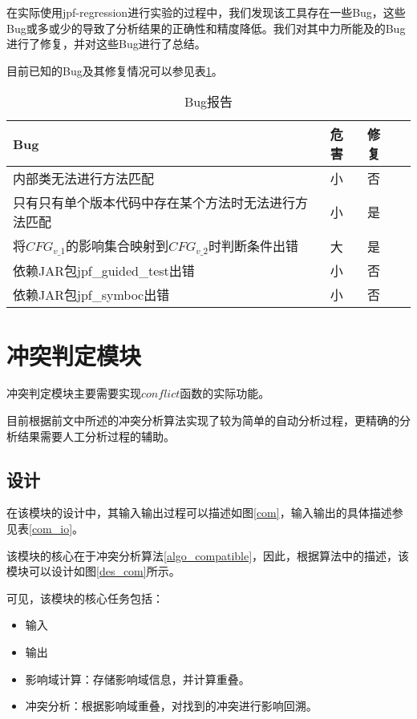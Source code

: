 在实际使用jpf-regression进行实验的过程中，我们发现该工具存在一些Bug，这些Bug或多或少的导致了分析结果的正确性和精度降低。我们对其中力所能及的Bug进行了修复，并对这些Bug进行了总结。

目前已知的Bug及其修复情况可以参见表\ref {bug_data}。

\begin{table}
	\caption{Bug报告}
	\label{bug_data}
	\centering
	\begin{tabular}{lllc}
		\toprule[1.5pt]
		{\heiti Bug} &{\heiti 危害} & {\heiti 修复} \\\midrule[1pt]
		内部类无法进行方法匹配 & 小 & 否\\
		只有只有单个版本代码中存在某个方法时无法进行方法匹配 & 小 & 是\\
		将$CFG_{v\_1}$的影响集合映射到$CFG_{v\_2}$时判断条件出错 & 大 & 是\\
		依赖JAR包jpf\_guided\_test出错 & 小 & 否\\
		依赖JAR包jpf\_symboc出错 & 小 & 否\\
		\bottomrule[1.5pt]
	\end{tabular}
\end{table}

\section{冲突判定模块}
\label {tool_conflict}

冲突判定模块主要需要实现$conflict$函数的实际功能。

目前根据前文中所述的冲突分析算法实现了较为简单的自动分析过程，更精确的分析结果需要人工分析过程的辅助。

\subsection{设计}

在该模块的设计中，其输入输出过程可以描述如图\ref {com}，输入输出的具体描述参见表\ref {com_io}。

该模块的核心在于冲突分析算法\ref {algo_compatible}，因此，根据算法中的描述，该模块可以设计如图\ref {des_com}所示。

可见，该模块的核心任务包括：
\begin{itemize}
	\item 输入
	\item 输出
	\item 影响域计算：存储影响域信息，并计算重叠。
	\item 冲突分析：根据影响域重叠，对找到的冲突进行影响回溯。
\end{itemize}


